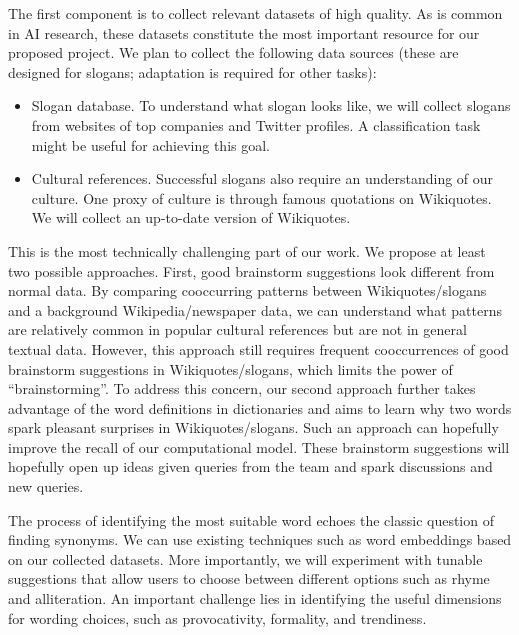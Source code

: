 The first component is to collect relevant datasets of high quality.
As is common in 
AI research,
these datasets constitute the most important resource for our proposed project.
We plan to collect the following data sources (these are designed for slogans; adaptation is required for other tasks):
\begin{itemize}[leftmargin=*,noitemsep,topsep=0pt,parsep=0pt,partopsep=0pt]
  \item Slogan database. To understand what slogan looks like, we will collect slogans from websites of top companies and Twitter profiles.
  A classification task might be useful for achieving this goal.
  \item Cultural references. Successful slogans also require an understanding of our culture. One proxy of culture is through famous quotations on Wikiquotes. We will collect an up-to-date version of Wikiquotes.
\end{itemize}




This is the most technically challenging part of our work.
We propose at least two possible approaches.
First, good brainstorm suggestions look different from normal data.
By comparing cooccurring patterns between Wikiquotes/slogans and a background Wikipedia/newspaper data, we can understand what patterns are relatively common in popular cultural references but are not in general textual data.
However, this approach still requires frequent cooccurrences of good brainstorm suggestions in Wikiquotes/slogans, which limits the power of ``brainstorming''.
To address this concern, our second approach further takes advantage of the word definitions in dictionaries and aims to learn why two words spark pleasant surprises in Wikiquotes/slogans.
Such an approach can hopefully improve the recall of our computational model.
These brainstorm suggestions will hopefully open up ideas given queries from the team and spark discussions and new queries.

 The process of identifying the most suitable word echoes the classic question of finding synonyms.
We can use existing techniques such as word embeddings based on our collected datasets.
More importantly, we will experiment with tunable suggestions that allow users to choose between different options such as rhyme and alliteration.
An important challenge lies in identifying the useful dimensions for wording choices, such as provocativity, formality, and trendiness.

